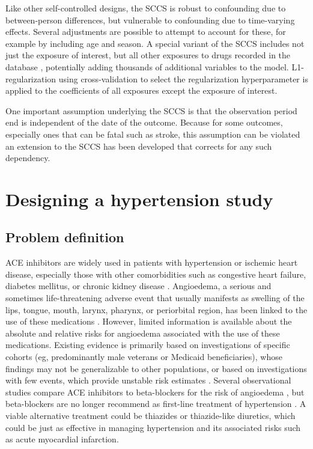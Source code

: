 \documentclass[]{book}
\begin{document}
Like other self-controlled designs, the SCCS is robust to confounding
due to between-person differences, but vulnerable to confounding due to
time-varying effects. Several adjustments are possible to attempt to
account for these, for example by including age and season. A special
variant of the SCCS includes not just the exposure of interest, but all
other exposures to drugs recorded in the database \citep{simpson_2013},
potentially adding thousands of additional variables to the model.
L1-regularization using cross-validation to select the regularization
hyperparameter is applied to the coefficients of all exposures except
the exposure of interest.

One important assumption underlying the SCCS is that the observation
period end is independent of the date of the outcome. Because for some
outcomes, especially ones that can be fatal such as stroke, this
assumption can be violated an extension to the SCCS has been developed
that corrects for any such dependency. \citep{farrington_2011}

\section{Designing a hypertension
study}\label{designing-a-hypertension-study}

\subsection{Problem definition}\label{problem-definition}

ACE inhibitors are widely used in patients with hypertension or ischemic
heart disease, especially those with other comorbidities such as
congestive heart failure, diabetes mellitus, or chronic kidney disease
\citep{zaman_2002}. Angioedema, a serious and sometimes life-threatening
adverse event that usually manifests as swelling of the lips, tongue,
mouth, larynx, pharynx, or periorbital region, has been linked to the
use of these medications \citep{sabroe_1997}. However, limited
information is available about the absolute and relative risks for
angioedema associated with the use of these medications. Existing
evidence is primarily based on investigations of specific cohorts (eg,
predominantly male veterans or Medicaid beneficiaries), whose findings
may not be generalizable to other populations, or based on
investigations with few events, which provide unstable risk estimates
\citep{powers_2012}. Several observational studies compare ACE
inhibitors to beta-blockers for the risk of angioedema
\citep{magid_2010, toh_2012}, but beta-blockers are no longer recommend
as first-line treatment of hypertension \citep{whelton_2018}. A viable
alternative treatment could be thiazides or thiazide-like diuretics,
which could be just as effective in managing hypertension and its
associated risks such as acute myocardial infarction.
\end{document}
